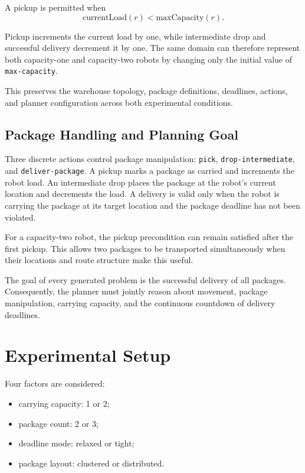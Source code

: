 \documentclass[conference]{IEEEtran}
\begin{document}
A pickup is permitted when
\begin{equation}
\mathrm{currentLoad}(r)<\mathrm{maxCapacity}(r).
\end{equation}

Pickup increments the current load by one, while intermediate drop and
successful delivery decrement it by one. The same domain can therefore
represent both capacity-one and capacity-two robots by changing only the
initial value of \texttt{max-capacity}.

This preserves the warehouse topology, package definitions, deadlines,
actions, and planner configuration across both experimental conditions.

\subsection{Package Handling and Planning Goal}

Three discrete actions control package manipulation:
\texttt{pick}, \texttt{drop-intermediate}, and
\texttt{deliver-package}. A pickup marks a package as carried and increments
the robot load. An intermediate drop places the package at the robot's current
location and decrements the load. A delivery is valid only when the robot is
carrying the package at its target location and the package deadline has not
been violated.

For a capacity-two robot, the pickup precondition can remain satisfied after
the first pickup. This allows two packages to be transported simultaneously
when their locations and route structure make this useful.

The goal of every generated problem is the successful delivery of all
packages. Consequently, the planner must jointly reason about movement,
package manipulation, carrying capacity, and the continuous countdown of
delivery deadlines.

\section{Experimental Setup}

Four factors are considered:
\begin{itemize}
    \item carrying capacity: 1 or 2;
    \item package count: 2 or 3;
    \item deadline mode: relaxed or tight;
    \item package layout: clustered or distributed.
\end{itemize}
\end{document}
